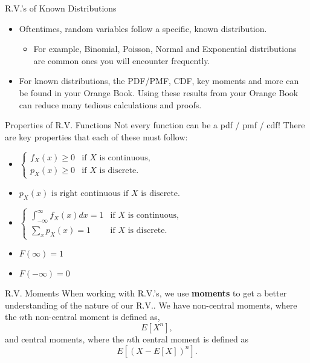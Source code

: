 \documentclass{beamer}
\begin{document}
\begin{frame}{R.V.'s of Known Distributions}
    \begin{itemize}
        \item Oftentimes, random variables follow a specific, known distribution.
        \begin{itemize}
            \item For example, Binomial, Poisson, Normal and Exponential distributions are common ones you will encounter frequently.
        \end{itemize}
        \item For known distributions, the PDF/PMF, CDF, key moments and more can be found in your Orange Book. Using these results from your Orange Book can reduce many tedious calculations and proofs.
    \end{itemize}
\end{frame}

\begin{frame}{Properties of R.V. Functions}
    Not every function can be a pdf / pmf / cdf! There are key properties that each of these must follow:
    \begin{itemize}
        \item $\begin{cases}
            f_X(x) \ge 0 & \text{if } X \text{ is continuous,} \\
            p_X(x) \ge 0 & \text{if } X \text{ is discrete.}
        \end{cases}$
        \item $p_X(x) \text{ is right continuous} \text{  if } X \text{ is discrete.}$
        \item $\begin{cases}
            \int_{-\infty}^{\infty} f_X(x) dx = 1 &\text{if } X \text{ is continuous,} \\
            \sum_{x} p_X(x) = 1 & \text{if } X \text{ is discrete}.
        \end{cases}$
        \item $F(\infty) = 1$
        \item $F(-\infty) = 0$
    \end{itemize}
\end{frame}

\begin{frame}{R.V. Moments}
    When working with R.V.'s, we use \textbf{moments} to get a better understanding of the nature of our R.V.. 
    \newline \newline
    We have non-central moments, where the $n$th non-central moment is defined as, $$E\left[ X^n \right],$$ 
    and central moments, where the $n$th central moment is defined as $$E\left[ (X - E[X] )^n \right].$$    
\end{frame}
\end{document}
